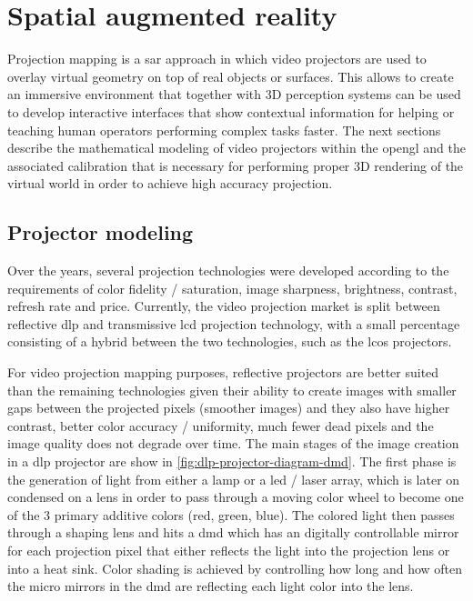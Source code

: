 \section{Spatial augmented reality}\label{sec:sar}

Projection mapping is a \gls{sar} \cite{Bimber2005} approach in which video projectors are used to overlay virtual geometry on top of real objects or surfaces. This allows to create an immersive environment that together with 3D perception systems can be used to develop interactive interfaces that show contextual information for helping or teaching human operators performing complex tasks faster. The next sections describe the mathematical modeling of video projectors within the \gls{opengl} and the associated calibration that is necessary for performing proper 3D rendering of the virtual world in order to achieve high accuracy projection.


\subsection{Projector modeling}

Over the years, several projection technologies were developed according to the requirements of color fidelity / saturation, image sharpness, brightness, contrast, refresh rate and price. Currently, the video projection market is split between reflective \gls{dlp} and transmissive \gls{lcd} projection technology, with a small percentage consisting of a hybrid between the two technologies, such as the \gls{lcos} projectors.

For video projection mapping purposes, reflective projectors are better suited than the remaining technologies given their ability to create images with smaller gaps between the projected pixels (smoother images) and they also have higher contrast, better color accuracy / uniformity, much fewer dead pixels and the image quality does not degrade over time. The main stages of the image creation in a \gls{dlp} projector are show in \cref{fig:dlp-projector-diagram-dmd}. The first phase is the generation of light from either a lamp or a \gls{led} / laser array, which is later on condensed on a lens in order to pass through a moving color wheel to become one of the 3 primary additive colors (red, green, blue). The colored light then passes through a shaping lens and hits a \gls{dmd} which has an digitally controllable mirror for each projection pixel that either reflects the light into the projection lens or into a heat sink. Color shading is achieved by controlling how long and how often the micro mirrors in the \gls{dmd} are reflecting each light color into the lens.

